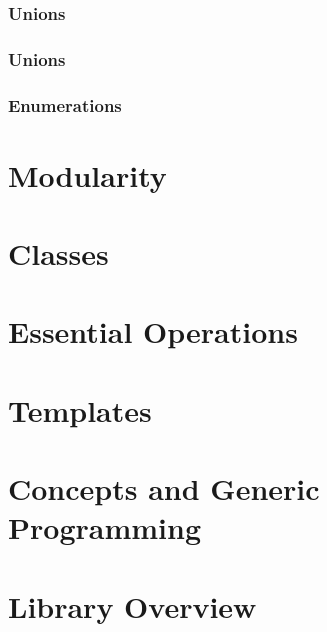 \documentclass{article}
\begin{document}
\subsubsection{Unions}

\subsubsection{Unions}

\subsubsection{Enumerations}
%

\section{Modularity}

\section{Classes}

\section{Essential Operations}

\section{Templates}

\section{Concepts and Generic Programming}

\section{Library Overview}
\end{document}
